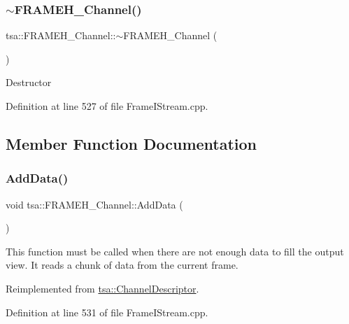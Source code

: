\subsubsection{\texorpdfstring{$\sim$\+F\+R\+A\+M\+E\+H\+\_\+\+Channel()}{~FRAMEH\_Channel()}}
{\footnotesize\ttfamily tsa\+::\+F\+R\+A\+M\+E\+H\+\_\+\+Channel\+::$\sim$\+F\+R\+A\+M\+E\+H\+\_\+\+Channel (\begin{DoxyParamCaption}{ }\end{DoxyParamCaption})\hspace{0.3cm}{\ttfamily [virtual]}}

Destructor 

Definition at line 527 of file Frame\+I\+Stream.\+cpp.



\subsection{Member Function Documentation}
\mbox{\label{classtsa_1_1_f_r_a_m_e_h___channel_af757e23c465da95ac0ed7b97876ead66}} 
\subsubsection{\texorpdfstring{Add\+Data()}{AddData()}}
{\footnotesize\ttfamily void tsa\+::\+F\+R\+A\+M\+E\+H\+\_\+\+Channel\+::\+Add\+Data (\begin{DoxyParamCaption}{ }\end{DoxyParamCaption})\hspace{0.3cm}{\ttfamily [virtual]}}

This function must be called when there are not enough data to fill the output view. It reads a chunk of data from the current frame. 

Reimplemented from \hyperlink{classtsa_1_1_channel_descriptor_aa1e001a5e712415cd4e9d66846914a56}{tsa\+::\+Channel\+Descriptor}.



Definition at line 531 of file Frame\+I\+Stream.\+cpp.

\mbox{\label{classtsa_1_1_f_r_a_m_e_h___channel_a9a920292ece110df4cdce41f9f8e451b}} 
